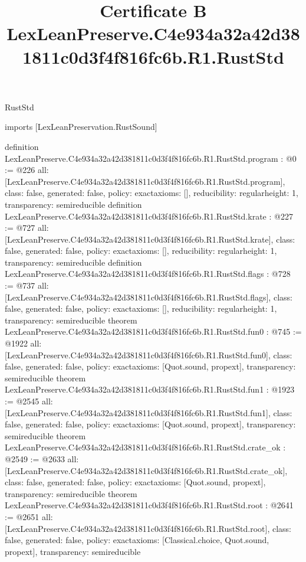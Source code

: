 \begin{lexlean}{RustStd}
\title{Certificate B LexLeanPreserve.C4e934a32a42d381811c0d3f4f816fc6b.R1.RustStd}
\begin{coremodule}
imports [LexLeanPreservation.RustSound]

definition LexLeanPreserve.C4e934a32a42d381811c0d3f4f816fc6b.R1.RustStd.program : @0 := @226 {
  all: [LexLeanPreserve.C4e934a32a42d381811c0d3f4f816fc6b.R1.RustStd.program],
  class: false,
  generated: false,
  policy: exact{axioms: []},
  reducibility: regular{height: 1},
  transparency: semireducible
}
definition LexLeanPreserve.C4e934a32a42d381811c0d3f4f816fc6b.R1.RustStd.krate : @227 := @727 {
  all: [LexLeanPreserve.C4e934a32a42d381811c0d3f4f816fc6b.R1.RustStd.krate],
  class: false,
  generated: false,
  policy: exact{axioms: []},
  reducibility: regular{height: 1},
  transparency: semireducible
}
definition LexLeanPreserve.C4e934a32a42d381811c0d3f4f816fc6b.R1.RustStd.flags : @728 := @737 {
  all: [LexLeanPreserve.C4e934a32a42d381811c0d3f4f816fc6b.R1.RustStd.flags],
  class: false,
  generated: false,
  policy: exact{axioms: []},
  reducibility: regular{height: 1},
  transparency: semireducible
}
theorem LexLeanPreserve.C4e934a32a42d381811c0d3f4f816fc6b.R1.RustStd.fun0 : @745 := @1922 {
  all: [LexLeanPreserve.C4e934a32a42d381811c0d3f4f816fc6b.R1.RustStd.fun0],
  class: false,
  generated: false,
  policy: exact{axioms: [Quot.sound, propext]},
  transparency: semireducible
}
theorem LexLeanPreserve.C4e934a32a42d381811c0d3f4f816fc6b.R1.RustStd.fun1 : @1923 := @2545 {
  all: [LexLeanPreserve.C4e934a32a42d381811c0d3f4f816fc6b.R1.RustStd.fun1],
  class: false,
  generated: false,
  policy: exact{axioms: [Quot.sound, propext]},
  transparency: semireducible
}
theorem LexLeanPreserve.C4e934a32a42d381811c0d3f4f816fc6b.R1.RustStd.crate_ok : @2549 := @2633 {
  all: [LexLeanPreserve.C4e934a32a42d381811c0d3f4f816fc6b.R1.RustStd.crate_ok],
  class: false,
  generated: false,
  policy: exact{axioms: [Quot.sound, propext]},
  transparency: semireducible
}
theorem LexLeanPreserve.C4e934a32a42d381811c0d3f4f816fc6b.R1.RustStd.root : @2641 := @2651 {
  all: [LexLeanPreserve.C4e934a32a42d381811c0d3f4f816fc6b.R1.RustStd.root],
  class: false,
  generated: false,
  policy: exact{axioms: [Classical.choice, Quot.sound, propext]},
  transparency: semireducible
}


\end{coremodule}
\end{lexlean}
